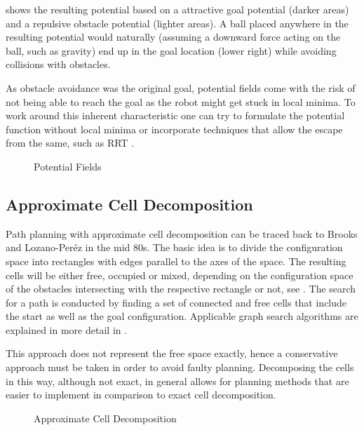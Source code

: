  shows the resulting potential based on a attractive goal potential (darker areas) and a repulsive obstacle potential (lighter areas). A ball placed anywhere in the resulting potential would naturally (assuming a downward force acting on the ball, such as gravity) end up in the goal location (lower right) while avoiding collisions with obstacles.

As obstacle avoidance was the original goal, potential fields come with the risk of not being able to reach the goal as the robot might get stuck in local minima. To work around this inherent characteristic one can try to formulate the potential function without local minima or incorporate techniques that allow the escape from the same, such as RRT \cite{LaValle.2006}. \cite{Latombe.1991}

\begin{figure}[h]
    \caption{Potential Fields}
    \label{fig:potentialFields}
\end{figure}

\subsection{Approximate Cell Decomposition}
Path planning with approximate cell decomposition can be traced back to Brooks and Lozano-Peréz in the mid 80s. The basic idea is to divide the configuration space into rectangles with edges parallel to the axes of the space. The resulting cells will be either free, occupied or mixed, depending on the configuration space of the obstacles intersecting with the respective rectangle or not, see . The search for a path is conducted by finding a set of connected and free cells that include the start as well as the goal configuration.\cite{Brooks.1985} Applicable graph search algorithms are explained in more detail in .

This approach does not represent the free space exactly, hence a conservative approach must be taken in order to avoid faulty planning. Decomposing the cells in this way, although not exact, in general allows for planning methods that are easier to implement in comparison to exact cell decomposition. \cite{Latombe.1991}

\begin{figure}[h]
    \caption{Approximate Cell Decomposition}
    \label{fig:cellDecomposition}
\end{figure}

